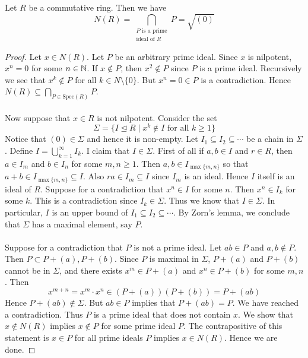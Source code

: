 \documentclass[a4paper]{article}
\begin{document}
\begin{prp}{}{} Let $R$ be a commutative ring. Then we have $$N(R)=\bigcap_{\substack{P\text{ is a prime}\\\text{ideal of }R}}P=\sqrt{(0)}$$ \tcbline
\begin{proof}
Let $x\in N(R)$. Let $P$ be an arbitrary prime ideal. Since $x$ is nilpotent, $x^n=0$ for some $n\in\mathbb{N}$. If $x\notin P$, then $x^2\notin P$ since $P$ is a prime ideal. Recursively we see that $x^k\notin P$ for all $k\in N\setminus\{0\}$. But $x^n=0\in P$ is a contradiction. Hence $N(R)\subseteq\bigcap_{P\in\text{Spec}(R)}P$. \\~\\

Now suppose that $x\in R$ is not nilpotent. Consider the set $$\Sigma=\{I\trianglelefteq R\;|\;x^k\notin I\text{ for all }k\geq 1\}$$ Notice that $(0)\in\Sigma$ and hence it is non-empty. Let $I_1\subseteq I_2\subseteq\cdots$ be a chain in $\Sigma$. Define $I=\bigcup_{k=1}^\infty I_k$. I claim that $I\in\Sigma$. First of all if $a,b\in I$ and $r\in R$, then $a\in I_m$ and $b\in I_n$ for some $m,n\geq 1$. Then $a,b\in I_{\max\{m,n\}}$ so that $a+b\in I_{\max\{m,n\}}\subseteq I$. Also $ra\in I_m\subseteq I$ since $I_m$ is an ideal. Hence $I$ itself is an ideal of $R$. Suppose for a contradiction that $x^n\in I$ for some $n$. Then $x^n\in I_k$ for some $k$. This is a contradiction since $I_k\in\Sigma$. Thus we know that $I\in\Sigma$. In particular, $I$ is an upper bound of $I_1\subseteq I_2\subseteq\cdots$. By Zorn's lemma, we conclude that $\Sigma$ has a maximal element, say $P$. \\~\\

Suppose for a contradiction that $P$ is not a prime ideal. Let $ab\in P$ and $a,b\notin P$. Then $P\subset P+(a),P+(b)$. Since $P$ is maximal in $\Sigma$, $P+(a)$ and $P+(b)$ cannot be in $\Sigma$, and there exists $x^m\in P+(a)$ and $x^n\in P+(b)$ for some $m,n$. Then $$x^{m+n}=x^m\cdot x^n\in (P+(a))(P+(b))=P+(ab)$$ Hence $P+(ab)\notin\Sigma$. But $ab\in P$ implies that $P+(ab)=P$. We have reached a contradiction. Thus $P$ is a prime ideal that does not contain $x$. We show that $x\notin N(R)$ implies $x\notin P$ for some prime ideal $P$. The contrapositive of this statement is $x\in P$ for all prime ideals $P$ implies $x\in N(R)$. Hence we are done. 
\end{proof}
\end{prp}
\end{document}
